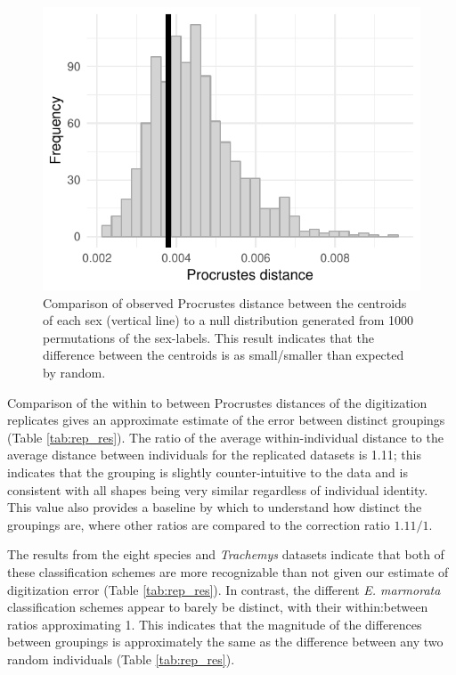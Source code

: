 \documentclass[12pt,letterpaper]{article}
\begin{document}
\begin{figure}[ht]
  \centering
  \includegraphics[height = 0.3\textheight, width = \textwidth, keepaspectratio = true]{figure/sex_test_hist}
  \caption{Comparison of observed Procrustes distance between the centroids of each sex (vertical line) to a null distribution generated from 1000 permutations of the sex-labels. This result indicates that the difference between the centroids is as small/smaller than expected by random.}
  \label{fig:sex_test}
\end{figure}


Comparison of the within to between Procrustes distances of the digitization replicates gives an approximate estimate of the error between distinct groupings (Table \ref{tab:rep_res}). The ratio of the average within-individual distance to the average distance between individuals for the replicated datasets is 1.11; this indicates that the grouping is slightly counter-intuitive to the data and is consistent with all shapes being very similar regardless of individual identity. This value also provides a baseline by which to understand how distinct the groupings are, where other ratios are compared to the correction ratio \(1.11/1\). 

The results from the eight species and \textit{Trachemys} datasets indicate that both of these classification schemes are more recognizable than not given our estimate of digitization error (Table \ref{tab:rep_res}). In contrast, the different \textit{E. marmorata} classification schemes appear to barely be distinct, with their within:between ratios approximating 1. This indicates that the magnitude of the differences between groupings is approximately the same as the difference between any two random individuals (Table \ref{tab:rep_res}).
\end{document}
